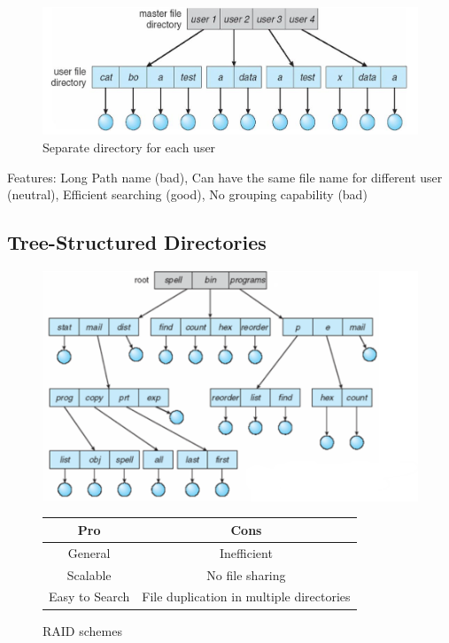 \begin{figure}[h!]
    \centering
    \includegraphics[width=0.5\linewidth]{img/fng.png}
    \caption{Separate directory for each user}
\end{figure}

Features: Long Path name (bad), Can have the same file name for different user (neutral), Efficient searching (good), No grouping capability (bad)

\newpage
\subsection{Tree-Structured Directories}


\begin{figure}[h!]
    \begin{minipage}[h!]{0.5\textwidth}
        \centering
        \includegraphics[width=1\linewidth]{img/dfsbv.png}
    \caption{RAID schemes}
    \end{minipage}
    \begin{minipage}[h!]{0.5\textwidth}
    \centering
    \begin{tabular}{c|c}
        Pro & Cons \\
        \hline
        General &Inefficient\\
        Scalable & No file sharing\\
        Easy to Search & File duplication in multiple directories
    \end{tabular}

    \end{minipage}
\end{figure}



